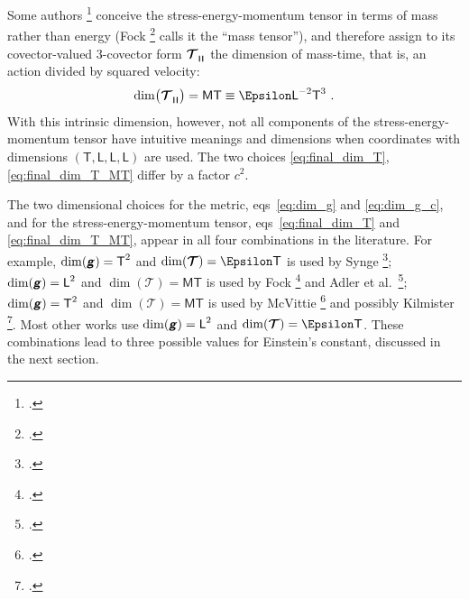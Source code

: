\documentclass[\ifafour a4paper,12pt,\else a5paper,10pt,\fi%
onecolumn,oneside,article,%
british%
]{memoir}
\makeatletter
\theoremstyle{remark}
\theoremstyle{innote}
\newcommand*{\mathte}[1]{\textbf{\textit{\textsf{#1}}}}
\newcommand*{\citep}{\footcites}
\renewcommand*{\|}[1][]{\nonscript\,#1\vert\nonscript\;\mathopen{}}
\newcommand*{\sect}{\S}%
\newcommand*{\sects}{\S\S}%
\newcommand*{\chaps}{chs}%
\newcommand*{\eqns}{eqs}%
\newcommand*{\eg}{{e.g.}}
\newcommand*{\etal}{{et al.}}
\newcommand*{\q}{}%
\DeclareRobustCommand*{\q}{%
  \mathord{\mathpalette\bigcdot@{}}%
}
\newcommand*{\bigcdot@scalefactor}{0.7}
\newcommand*{\bigcdot@widthfactor}{1.5}
\newcommand*{\bigcdot@}[2]{%
  \sbox0{$#1\vcenter{}$}%
  \sbox2{$#1\cdot\m@th$}%
  \hbox to \bigcdot@widthfactor\wd2{%
    \hfil
    \raise\ht0\hbox{%
      \scalebox{\bigcdot@scalefactor}{%
        \lower\ht0\hbox{$#1\bullet\m@th$}%
      }%
    }%
    \hfil
  }%
}
\newcommand*{\Le}{\textsf{L}}
\newcommand*{\Ti}{\textsf{T}}
\newcommand*{\Ma}{\textsf{M}}
\newcommand*{\En}{\Epsilon}%
\newcommand*{\yg}{\mathte{g}}
\newcommand*{\yT}{\bm{\mathcal{T}}}
\renewcommand*{\i}{\indices}
\newcommand*{\rul}{{\mkern2mu\rule[-0.1ex]{0.75pt}{1.1ex}\mkern2mu}}
\DeclarePairedDelimiter\mul{\rul}{\rul}%
\makeatother
\begin{document}
Some authors
\citep[\eg][\sect~V.55]{fock1955_t1964}[\sect~4.1]{mcvittie1956_r1965}[\sect~10.1]{adleretal1965_r1975}
conceive the stress-energy-momentum tensor in terms of mass rather than
energy (Fock \citep[\sect~II.31]{fock1955_t1964} calls it the \enquote{mass
  tensor}), and therefore assign to its covector-valued 3-covector form
$\yT\i{_{\q \mul{\q\q\q}}}$ the dimension of mass-time, that is, an action
divided by squared velocity:
\begin{equation}
  \label{eq:final_dim_T_MT}
  \dim\bigl(\yT\i{_{\q \mul{\q\q\q}}}\bigr) = \Ma\Ti \equiv \En\Le^{-2}\Ti^{3} \ .
\end{equation}
With this intrinsic dimension, however, not all components of the
stress-energy-momentum tensor have intuitive meanings and dimensions when
coordinates with dimensions $(\Ti,\Le,\Le,\Le)$ are used. The two choices
\eqref{eq:final_dim_T}, \eqref{eq:final_dim_T_MT} differ by a factor
$c^{2}$.

\medskip

The two dimensional choices for the metric, \eqns~\eqref{eq:dim_g} and
\eqref{eq:dim_g_c}, and for the stress-energy-momentum tensor,
\eqns~\eqref{eq:final_dim_T} and \eqref{eq:final_dim_T_MT}, appear in all
four combinations in the literature. For example, $\dim(\yg)=\Ti^{2}$ and
$\dim(\yT)=\En\Ti$ is used by Synge \citep[\sects~IV.4--5]{synge1960b};
$\dim(\yg)=\Le^{2}$ and $\dim(\yT)=\Ma\Ti$ is used by Fock
\citep[\sects~V.54--55]{fock1955_t1964} and Adler \etal\
\citep[\sect~10.1]{adleretal1965_r1975}; $\dim(\yg)=\Ti^{2}$ and
$\dim(\yT)=\Ma\Ti$ is used by McVittie
\citep[\sect~4.1]{mcvittie1956_r1965} and possibly Kilmister
\citep[\chaps~II--III; he seems to shift to natural units at some
point]{kilmister1973}. Most other works use $\dim(\yg)=\Le^{2}$ and
$\dim(\yT)=\En\Ti$. These combinations lead to three possible values for
Einstein's constant, discussed in the next section.


\medskip
\end{document}
